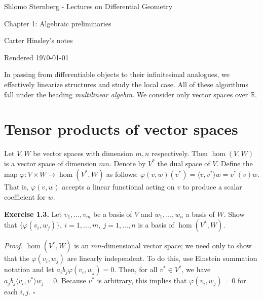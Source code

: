 \documentclass[a4paper]{article}
\newcommand{\R}{\mathbb{R}}
\begin{document}
\begin{center}
\LARGE{Shlomo Sternberg - Lectures on Differential Geometry}

\Large{Chapter 1: Algebraic preliminaries}

\large{Carter Hinsley's notes}

Rendered \today
\end{center}

In passing from differentiable objects to their infinitesimal analogues, we effectively linearize structures and study the local case. All of these algorithms fall under the heading \emph{multilinear algebra}. We consider only vector spaces over $\R$.

\section{Tensor products of vector spaces}

Let $V, W$ be vector spaces with dimension $m, n$ respectively. Then $\hom(V, W)$ is a vector space of dimension $mn$. Denote by $V^*$ the dual space of $V$. Define the map $\varphi : V \times W \to \hom(V^*, W)$ as follows: $\varphi(v, w)(v^*) = \langle v, v^* \rangle w = v^*(v) w$. That is, $\varphi(v, w)$ accepts a linear functional acting on $v$ to produce a scalar coefficient for $w$.

\textbf{Exercise 1.3.} Let $v_1, \ldots, v_m$ be a basis of $V$ and $w_1, \ldots, w_n$ a basis of $W$. Show that $\{\varphi(v_i, w_j)\},\ i = 1, \ldots, m,\ j = 1, \ldots, n$ is a basis of $\hom(V^*, W)$.

\emph{Proof.} $\hom(V^*, W)$ is an $mn$-dimensional vector space; we need only to show that the $\varphi(v_i, w_j)$ are linearly independent. To do this, use Einstein summation notation and let $a_ib_j\varphi(v_i, w_j) = 0$. Then, for all $v^* \in V^*$, we have $a_jb_j\langle v_i, v^* \rangle w_j = 0$. Because $v^*$ is arbitrary, this implies that $\varphi(v_i, w_j) = 0$ for each $i, j$. $\square$
\end{document}
